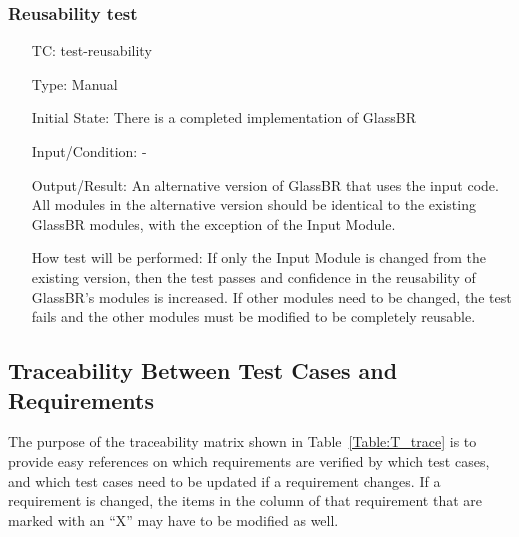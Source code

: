 \documentclass[12pt, titlepage]{article}
\newcounter{testnum} %
\newcommand{\progname}{GlassBR}
\begin{document}
\subsubsection{Reusability test}

\begin{enumerate}[label=TC\arabic*:,ref={\arabic*}]
	
\item [TC\refstepcounter{testnum}\thetestnum: \label{TC_Reusability}] 
test-reusability

Type: Manual

Initial State: There is a completed implementation of \progname{}
	
Input/Condition: -

Output/Result: An alternative version of \progname{} that uses the input code. 
All modules in the alternative version should be identical to the existing 
\progname{} modules, with the exception of the Input Module.

How test will be performed:  If only the Input Module is changed from the 
existing version, then the test passes and confidence in the reusability of 
\progname{}'s modules is increased. If other modules need to be changed, the 
test fails and the other modules must be modified to be completely reusable.
	
\end{enumerate}

\subsection{Traceability Between Test Cases and Requirements}

\noindent The purpose of the traceability matrix shown in 
Table~\ref{Table:T_trace} is to provide easy 
references on which requirements are verified by which test cases, and which 
test cases need to be updated if a requirement changes.  If a requirement is 
changed, the items in the column of that requirement that are marked
with an ``X'' may have to be modified as well. 
\end{document}
